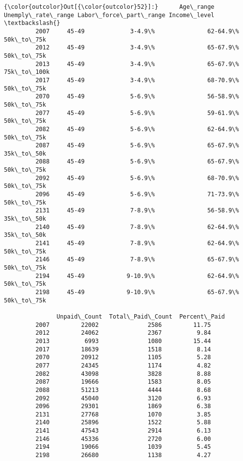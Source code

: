 \documentclass[11pt]{article}
\begin{document}
\begin{Verbatim}[commandchars=\\\{\}]
{\color{outcolor}Out[{\color{outcolor}52}]:}      Age\_range Unemply\_rate\_range Labor\_force\_part\_range Income\_level  \textbackslash{}
         2007     45-49             3-4.9\%               62-64.9\%   50k\_to\_75k   
         2012     45-49             3-4.9\%               65-67.9\%   50k\_to\_75k   
         2013     45-49             3-4.9\%               65-67.9\%  75k\_to\_100k   
         2017     45-49             3-4.9\%               68-70.9\%   50k\_to\_75k   
         2070     45-49             5-6.9\%               56-58.9\%   50k\_to\_75k   
         2077     45-49             5-6.9\%               59-61.9\%   50k\_to\_75k   
         2082     45-49             5-6.9\%               62-64.9\%   50k\_to\_75k   
         2087     45-49             5-6.9\%               65-67.9\%   35k\_to\_50k   
         2088     45-49             5-6.9\%               65-67.9\%   50k\_to\_75k   
         2092     45-49             5-6.9\%               68-70.9\%   50k\_to\_75k   
         2096     45-49             5-6.9\%               71-73.9\%   50k\_to\_75k   
         2131     45-49             7-8.9\%               56-58.9\%   35k\_to\_50k   
         2140     45-49             7-8.9\%               62-64.9\%   35k\_to\_50k   
         2141     45-49             7-8.9\%               62-64.9\%   50k\_to\_75k   
         2146     45-49             7-8.9\%               65-67.9\%   50k\_to\_75k   
         2194     45-49            9-10.9\%               62-64.9\%   50k\_to\_75k   
         2198     45-49            9-10.9\%               65-67.9\%   50k\_to\_75k   
         
               Unpaid\_Count  Total\_Paid\_Count  Percent\_Paid  
         2007         22002              2586         11.75  
         2012         24062              2367          9.84  
         2013          6993              1080         15.44  
         2017         18639              1518          8.14  
         2070         20912              1105          5.28  
         2077         24345              1174          4.82  
         2082         43098              3828          8.88  
         2087         19666              1583          8.05  
         2088         51213              4444          8.68  
         2092         45040              3120          6.93  
         2096         29301              1869          6.38  
         2131         27768              1070          3.85  
         2140         25896              1522          5.88  
         2141         47543              2914          6.13  
         2146         45336              2720          6.00  
         2194         19066              1039          5.45  
         2198         26680              1138          4.27  
\end{Verbatim}
            
\end{document}
